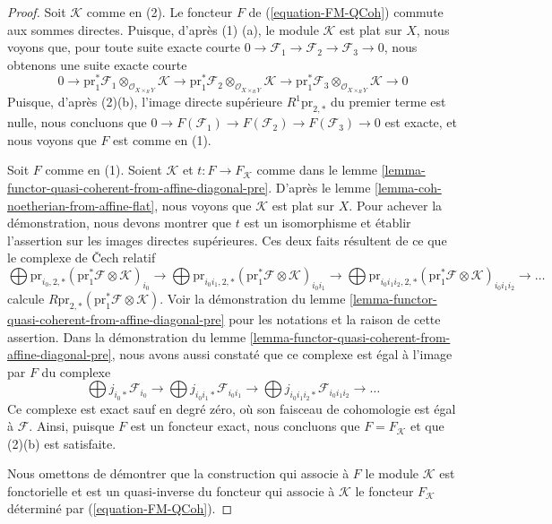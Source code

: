\begin{proof}
Soit $\mathcal{K}$ comme en (2). Le foncteur $F$ de
(\ref{equation-FM-QCoh}) commute aux sommes directes.
Puisque, d'après (1) (a), le module $\mathcal{K}$ est plat sur $X$,
nous voyons que, pour toute suite exacte courte
$0 \to \mathcal{F}_1 \to \mathcal{F}_2 \to \mathcal{F}_3 \to 0$,
nous obtenons une suite exacte courte
$$
0 \to
\text{pr}_1^*\mathcal{F}_1 \otimes_{\mathcal{O}_{X \times_R Y}} \mathcal{K} \to
\text{pr}_1^*\mathcal{F}_2 \otimes_{\mathcal{O}_{X \times_R Y}} \mathcal{K} \to
\text{pr}_1^*\mathcal{F}_3 \otimes_{\mathcal{O}_{X \times_R Y}} \mathcal{K} \to
0
$$
Puisque, d'après (2)(b), l'image directe supérieure $R^1\text{pr}_{2, *}$
du premier terme est nulle, nous concluons que
$0 \to F(\mathcal{F}_1) \to F(\mathcal{F}_2) \to F(\mathcal{F}_3) \to 0$
est exacte, et nous voyons que $F$ est comme en (1).

\medskip\noindent
Soit $F$ comme en (1). Soient $\mathcal{K}$ et $t : F \to F_\mathcal{K}$ comme
dans le lemme \ref{lemma-functor-quasi-coherent-from-affine-diagonal-pre}.
D'après le lemme \ref{lemma-coh-noetherian-from-affine-flat}, nous voyons
que $\mathcal{K}$ est plat sur $X$. Pour achever la démonstration, nous devons
montrer que $t$ est un isomorphisme et établir l'assertion sur les images
directes supérieures. Ces deux faits résultent de ce que le
complexe de {\v C}ech relatif
\begingroup\footnotesize
$$
\bigoplus 
\text{pr}_{i_0, 2, *}
(\text{pr}_1^*\mathcal{F} \otimes \mathcal{K})_{i_0}
\to
\bigoplus 
\text{pr}_{i_0i_1, 2, *}
(\text{pr}_1^*\mathcal{F} \otimes \mathcal{K})_{i_0i_1}
\to
\bigoplus 
\text{pr}_{i_0i_1i_2, 2, *}
(\text{pr}_1^*\mathcal{F} \otimes \mathcal{K})_{i_0i_1i_2}
\to \ldots
$$
\endgroup
calcule $R\text{pr}_{2, *}(\text{pr}_1^*\mathcal{F} \otimes \mathcal{K})$.
Voir la démonstration du
lemme \ref{lemma-functor-quasi-coherent-from-affine-diagonal-pre}
pour les notations et la raison de cette assertion. Dans la démonstration du
lemme \ref{lemma-functor-quasi-coherent-from-affine-diagonal-pre},
nous avons aussi constaté que ce complexe est égal à l'image par $F$ du complexe
$$
\bigoplus j_{i_0*}\mathcal{F}_{i_0} \to
\bigoplus j_{i_0i_1*}\mathcal{F}_{i_0i_1} \to
\bigoplus j_{i_0i_1i_2*}\mathcal{F}_{i_0i_1i_2} \to \ldots
$$
Ce complexe est exact sauf en degré zéro, où son faisceau de cohomologie
est égal à $\mathcal{F}$. Ainsi, puisque $F$ est un foncteur exact,
nous concluons que $F = F_\mathcal{K}$ et que (2)(b) est satisfaite.

\medskip\noindent
Nous omettons de démontrer que la construction qui associe à $F$
le module $\mathcal{K}$ est fonctorielle et est un quasi-inverse du
foncteur qui associe à $\mathcal{K}$ le foncteur $F_\mathcal{K}$
déterminé par (\ref{equation-FM-QCoh}).
\end{proof}

